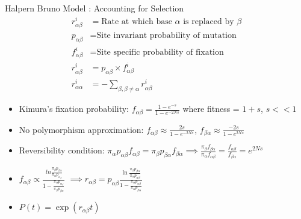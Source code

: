 \documentclass[10pt]{beamer}
\begin{document}
\begin{frame}[fragile]{Halpern Bruno Model : Accounting for Selection}
\begin{align*}
r_{\alpha\beta}^i &= \text{Rate at which base $\alpha$ is replaced by $\beta$}\\
p_{\alpha\beta} &= \text{Site invariant probability of mutation}\\
f_{\alpha\beta}^i &= \text{Site specific probability of fixation}\\
r_{\alpha\beta}^i &= p_{\alpha\beta} \times f_{\alpha\beta}^i\\
r_{\alpha\alpha}^i &= -\sum_{\beta, \beta \neq \alpha} r_{\alpha\beta}^i
\end{align*}
\begin{itemize}
\item Kimura's fixation probability: $f_{\alpha\beta} = \frac{1-e^{-s}}{1-e^{-2Ns}}$ where fitness = $1+s$, $s<<1$
\item No polymorphism approximation: $f_{\alpha\beta} \approx \frac{2s}{1-e^{-2Ns}}$, $f_{\beta\alpha} \approx \frac{-2s}{1-e^{2Ns}}$
\item Reversibility condition: $\pi_\alpha p_{\alpha\beta}f_{\alpha\beta} = \pi_\beta p_{\beta\alpha} f_{\beta\alpha} \implies \frac{\pi_\beta f_{\beta\alpha}}{\pi_\alpha f_{\alpha\beta}} = \frac{f_{\alpha\beta}}{f_{\beta\alpha}} = e^{2Ns} $\\
\item $f_{\alpha\beta} \propto \frac{\ ln{\frac{\pi_\beta p_{\beta\alpha}  }{ \pi_\alpha p_{\alpha_\beta} } }} 
{1- \frac{ \pi_\alpha p_{\alpha_\beta} } {\pi_\beta p_{\beta\alpha} } } $  $\implies r_{\alpha\beta} = p_{\alpha\beta} \frac{\ln{\frac{\pi_\beta p_{\beta\alpha}}{\pi_\alpha p_{\alpha\beta}}}}{1-\frac{\pi_\alpha p_{\alpha\beta}  }{\pi_\alpha p_{\beta\alpha}  } } $
\item $P(t) = \exp(r_{\alpha\beta} t)$
\end{itemize}
\end{frame}
\end{document}

